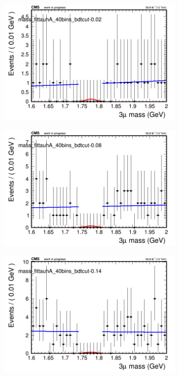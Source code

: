 \begin{figure}[H]
    \centering
    \begin{subfigure}{0.2\textwidth}
        \includegraphics[width=\textwidth]{unfixed_exp/plots/tauhA/massfit_tauhA_40bins_bdtcut-0.02.png}
        \caption{}
    \end{subfigure}
    \begin{subfigure}{0.2\textwidth}
        \includegraphics[width=\textwidth]{unfixed_exp/plots/tauhA/massfit_tauhA_40bins_bdtcut-0.08.png}
        \caption{}
    \end{subfigure}
    \begin{subfigure}{0.2\textwidth}
        \includegraphics[width=\textwidth]{unfixed_exp/plots/tauhA/massfit_tauhA_40bins_bdtcut-0.14.png}

\end{subfigure}
\end{figure}
